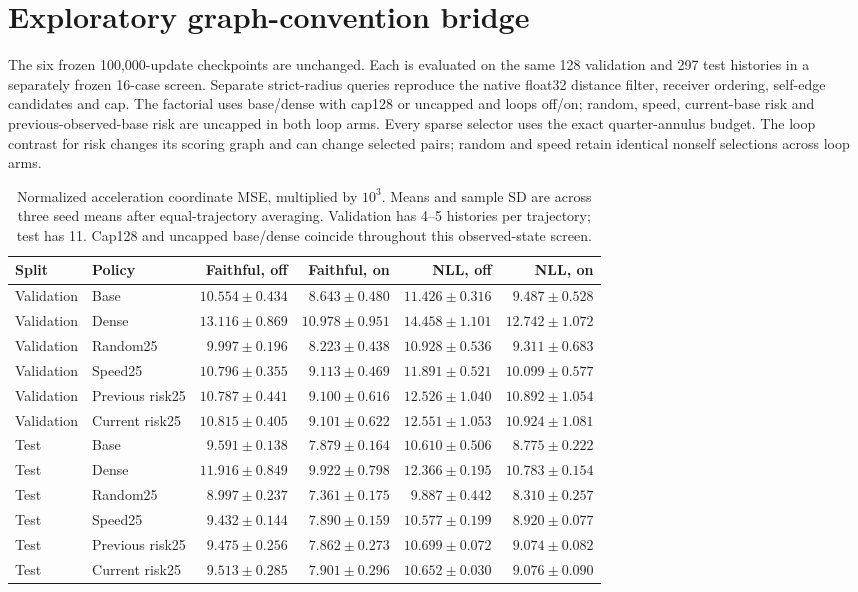 \section{Exploratory graph-convention bridge}
\label{sec:graph-bridge}
The six frozen 100,000-update checkpoints are unchanged. Each is evaluated on
the same 128 validation and 297 test histories in a separately frozen 16-case
screen. Separate strict-radius queries reproduce the native float32 distance
filter, receiver ordering, self-edge candidates and cap. The factorial uses
base/dense with cap128 or uncapped and loops off/on; random, speed,
current-base risk and previous-observed-base risk are uncapped in both loop arms.
Every sparse selector uses the exact quarter-annulus budget. The loop contrast
for risk changes its scoring graph and can change selected pairs; random and
speed retain identical nonself selections across loop arms.

\begin{table}[ht]
\centering\small
\caption{Normalized acceleration coordinate MSE, multiplied by $10^3$.
Means and sample SD are across three seed means after equal-trajectory
averaging. Validation has 4--5 histories per trajectory; test has 11.
Cap128 and uncapped base/dense coincide throughout this observed-state screen.}
\label{tab:graph-convention-bridge}
\begin{tabular}{llrrrr}
\toprule
Split & Policy & Faithful, off & Faithful, on & NLL, off & NLL, on\\
\midrule
Validation & Base & $10.554\pm0.434$ & $8.643\pm0.480$ & $11.426\pm0.316$ & $9.487\pm0.528$\\
Validation & Dense & $13.116\pm0.869$ & $10.978\pm0.951$ & $14.458\pm1.101$ & $12.742\pm1.072$\\
Validation & Random25 & $9.997\pm0.196$ & $8.223\pm0.438$ & $10.928\pm0.536$ & $9.311\pm0.683$\\
Validation & Speed25 & $10.796\pm0.355$ & $9.113\pm0.469$ & $11.891\pm0.521$ & $10.099\pm0.577$\\
Validation & Previous risk25 & $10.787\pm0.441$ & $9.100\pm0.616$ & $12.526\pm1.040$ & $10.892\pm1.054$\\
Validation & Current risk25 & $10.815\pm0.405$ & $9.101\pm0.622$ & $12.551\pm1.053$ & $10.924\pm1.081$\\
\midrule
Test & Base & $9.591\pm0.138$ & $7.879\pm0.164$ & $10.610\pm0.506$ & $8.775\pm0.222$\\
Test & Dense & $11.916\pm0.849$ & $9.922\pm0.798$ & $12.366\pm0.195$ & $10.783\pm0.154$\\
Test & Random25 & $8.997\pm0.237$ & $7.361\pm0.175$ & $9.887\pm0.442$ & $8.310\pm0.257$\\
Test & Speed25 & $9.432\pm0.144$ & $7.890\pm0.159$ & $10.577\pm0.199$ & $8.920\pm0.077$\\
Test & Previous risk25 & $9.475\pm0.256$ & $7.862\pm0.273$ & $10.699\pm0.072$ & $9.074\pm0.082$\\
Test & Current risk25 & $9.513\pm0.285$ & $7.901\pm0.296$ & $10.652\pm0.030$ & $9.076\pm0.090$\\
\midrule
\end{tabular}
\end{table}

